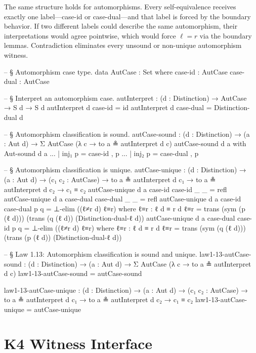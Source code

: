 \documentclass[11pt,a4paper]{book}
\def\texttt#1{#1}%
\def\texorpdfstring#1#2{#2}%
\begin{document}
The same structure holds for automorphisms. Every self-equivalence receives exactly one label—\texttt{case-id} or \texttt{case-dual}—and that label is forced by the boundary behavior. If two different labels could describe the same automorphism, their interpretations would agree pointwise, which would force $\ell = r$ via the boundary lemmas. Contradiction eliminates every unsound or non-unique automorphism witness.

\begin{code}
-- § Automorphism case type.
data AutCase : Set where
  case-id   : AutCase
  case-dual : AutCase

-- § Interpret an automorphism case.
autInterpret : (d : Distinction) → AutCase → S d → S d
autInterpret d case-id   = id
autInterpret d case-dual = Distinction-dual d

-- § Automorphism classification is sound.
autCase-sound :
  (d : Distinction) →
  (a : Aut d) →
  Σ AutCase (λ c → to a ≗ autInterpret d c)
autCase-sound d a with Aut-sound d a
... | inj₁ p = case-id   , p
... | inj₂ p = case-dual , p

-- § Automorphism classification is unique.
autCase-unique :
  (d : Distinction) →
  (a : Aut d) →
  (c₁ c₂ : AutCase) →
  to a ≗ autInterpret d c₁ →
  to a ≗ autInterpret d c₂ →
  c₁ ≡ c₂
autCase-unique d a case-id case-id _ _ = refl
autCase-unique d a case-dual case-dual _ _ = refl
autCase-unique d a case-id case-dual p q =
  ⊥-elim ((ℓ≠r d) ℓ≡r)
  where
    ℓ≡r : ℓ d ≡ r d
    ℓ≡r =
      trans (sym (p (ℓ d)))
        (trans (q (ℓ d)) (Distinction-dual-ℓ d))
autCase-unique d a case-dual case-id p q =
  ⊥-elim ((ℓ≠r d) ℓ≡r)
  where
    ℓ≡r : ℓ d ≡ r d
    ℓ≡r =
      trans (sym (q (ℓ d)))
        (trans (p (ℓ d)) (Distinction-dual-ℓ d))

-- § Law 1.13: Automorphism classification is sound and unique.
law1-13-autCase-sound :
  (d : Distinction) →
  (a : Aut d) →
  Σ AutCase (λ c → to a ≗ autInterpret d c)
law1-13-autCase-sound = autCase-sound

law1-13-autCase-unique :
  (d : Distinction) →
  (a : Aut d) →
  (c₁ c₂ : AutCase) →
  to a ≗ autInterpret d c₁ →
  to a ≗ autInterpret d c₂ →
  c₁ ≡ c₂
law1-13-autCase-unique = autCase-unique
\end{code}

\section{K\texorpdfstring{$_4$}{4} Witness Interface}
\end{document}
